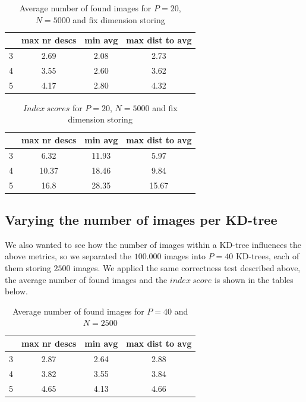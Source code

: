 \begin{table}[H]
\centering
\begin{tabular} {c | c | c | c}
	& max nr descs & min avg & max dist to avg \\
	\hline
	3 & 2.69 & 2.08 & 2.73 \\
	\hline
	4 & 3.55 & 2.60 & 3.62 \\
	\hline
	5 & 4.17 & 2.80 & 4.32 \\
\end{tabular}
\caption{Average number of found images for $P=20$, $N=5000$ and fix dimension storing}
\label{table:fixDimension1}
\end{table}

\begin{table}[H]
\centering
\begin{tabular} {c | c | c | c}
	& max nr descs & min avg & max dist to avg \\
	\hline
	3 & 6.32 & 11.93 & 5.97 \\
	\hline
	4 & 10.37 & 18.46 & 9.84 \\
	\hline
	5 & 16.8 & 28.35 & 15.67 \\
\end{tabular}
\caption{$Index\ scores$ for $P=20$, $N=5000$ and fix dimension storing}
\label{table:fixDimension2}
\end{table}

\subsection{Varying the number of images per KD-tree}

We also wanted to see how the number of images within a KD-tree influences the above metrics,
so we separated the $100.000$ images into $P=40$ KD-trees, each of them storing $2500$ images.
We applied the same correctness test described above, the average number of found images and the $index\ score$ is shown in the tables below.\\

\begin{table}[H]
\centering
\begin{tabular} {c | c | c | c}
	& max nr descs & min avg & max dist to avg \\
	\hline
	3 & 2.87 & 2.64 & 2.88 \\
	\hline
	4 & 3.82 & 3.55 & 3.84 \\
	\hline
	5 & 4.65 & 4.13 & 4.66 \\
\end{tabular}
\caption{Average number of found images for $P=40$ and $N=2500$}
\end{table}

